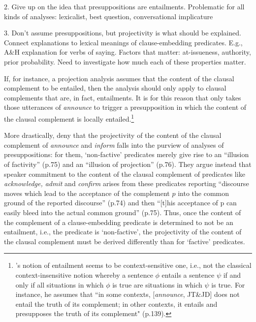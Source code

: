 \documentclass[11pt,fleqn]{article}
\newcommand{\6}{\mbox{$[\hspace*{-.6mm}[$}}
\newcommand{\9}{\mbox{$]\hspace*{-.6mm}]$}}
\newcommand{\citepos}[1]{\citeauthor{#1}'s \citeyear{#1}}
\begin{document}
{\begin{itemize}
2. Give up on the idea that presuppositions are entailments. Problematic for all kinds of analyses: lexicalist, best question, conversational implicature

3. Don't assume presuppositions, but projectivity is what should be explained. Connect explanations to lexical meanings of clause-embedding predicates. E.g., A\&H explanation for verbs of saying. Factors that matter: at-issueness, authority, prior probability. Need to investigate how much each of these properties matter.

\newpage


If, for instance, a projection analysis assumes that the content of the clausal complement to be entailed, then the analysis should only apply to  clausal complements that are, in fact, entailments. It is for this reason that \citet{schlenker10} only takes those utterances of {\em announce} to trigger a presupposition in which the content of the clausal complement is locally entailed.\footnote{\citepos{schlenker10} notion of entailment seems to be context-sensitive one, i.e., not the classical context-insensitive notion whereby a sentence $\phi$ entails a sentence $\psi$ if and only if all situations in which $\phi$ is true are situations in which $\psi$ is true. For instance, he assumes that ``in some contexts, [{\em announce}, JT\&JD] does not entail the truth of its complement; in other contexts, it entails and presupposes the truth of its complement" (p.139).} 

More drastically, \citet{anand-hacquard2014} deny that the projectivity of the content of the clausal complement of {\em announce} and {\em inform} falls into the purview of analyses of presuppositions: for them,  `non-factive' predicates merely give rise to an ``illusion of factivity'' (p.75) and an ``illusion of projection'' (p.76). They argue instead that speaker commitment to the content of the clausal complement of predicates like {\em acknowledge, admit} and {\em confirm} arises from these predicates reporting ``discourse moves which lead to the acceptance of the complement $p$ into the common ground of the reported discourse'' (p.74) and then ``[t]his acceptance of p can easily bleed into the actual common ground'' (p.75). Thus, once the content of the complement of a clause-embedding predicate is determined to not be an entailment, i.e., the predicate is `non-factive', the projectivity of the content of the clausal complement must be derived differently than for `factive' predicates.


\end{itemize}}
\end{document}
